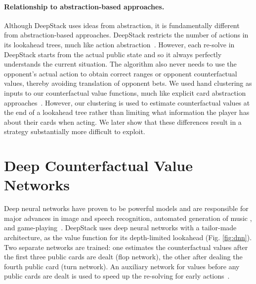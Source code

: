 \documentclass[12pt]{article}
\begin{document}
\paragraph*{Relationship to abstraction-based approaches.}

Although DeepStack uses ideas from abstraction, it is fundamentally different from abstraction-based approaches.  DeepStack restricts the number of actions in its lookahead trees, much like action abstraction~\cite{Gilpin08:Tartanian,Schnizlein09:Translation}.  However, each re-solve in DeepStack starts from the actual public state and 
 so it always perfectly understands the current situation.  The algorithm also never needs to use the opponent's actual action to obtain correct ranges or opponent counterfactual values, 
thereby avoiding translation of opponent bets.  We used hand clustering as inputs to our counterfactual value functions, much like explicit card abstraction approaches~\cite{Gilpin07:Abstraction,Johanson13:Abstraction}.  However, our clustering is used to estimate counterfactual values at the end of a lookahead tree rather than limiting what information the player has about their cards when acting.  
We later show that these differences result in a strategy substantially more difficult to exploit.

\section*{Deep Counterfactual Value Networks}

Deep neural networks have proven to be powerful models and are responsible for major advances in image and speech recognition\cite{Krizhevsky12:ImageNet,Hinton12:Speech}, automated generation of music \cite{Oord16:WaveNet}, and game-playing~\cite{Mnih15:DQN,Silver16:AlphaGo}.
DeepStack uses deep neural networks with a tailor-made architecture, as the value function for its depth-limited lookahead (Fig. \ref{fig:dnn}).  Two separate networks are trained: one estimates the counterfactual values after the first three public cards are dealt (flop network), the other after dealing the fourth public card (turn network). An auxiliary network for values before any public cards are dealt is used to speed up the re-solving for early actions~\cite{SOM}.
\end{document}
